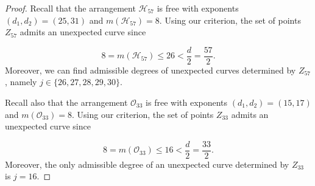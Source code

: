\documentclass[10pt,a4paper]{amsart}
\renewcommand\leq{\leqslant}
\begin{document}
\begin{proof}
Recall that the arrangement $\mathcal{H}_{57}$ is free with exponents $(d_{1},d_{2}) = (25,31)$ and $m(\mathcal{H}_{57}) = 8$. Using our criterion, the set of points $Z_{57}$ admits an unexpected curve since

$$8=m(\mathcal{H}_{57}) \leq 26 < \frac{d}{2}= \frac{57}{2}.$$
Moreover, we can find admissible degrees of unexpected curves determined by $Z_{57}$, namely $j \in \{26, 27, 28, 29, 30\}$.

Recall also that the arrangement $\mathcal{O}_{33}$ is free with exponents $(d_{1},d_{2}) = (15,17)$ and $m(\mathcal{O}_{33}) = 8$. Using our criterion, the set of points $Z_{33}$ admits an unexpected curve since

$$8 = m(\mathcal{O}_{33}) \leq 16 < \frac{d}{2} = \frac{33}{2} .$$
Moreover, the only admissible degree of an unexpected curve determined by $Z_{33}$ is $j = 16$.
\end{proof}
\end{document}
